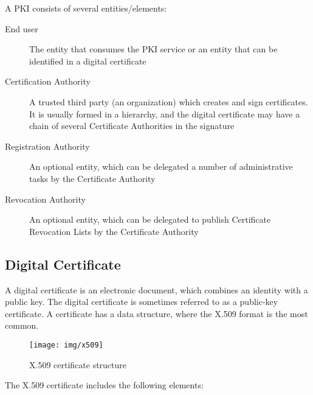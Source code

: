 \documentclass[12pt,a4paper,titlepage]{report}
\begin{document}
A PKI consists of several entities/elements:
\begin{description}
\item[End user] { The entity that consumes the PKI service or an entity that can be identified in a digital certificate }
\item[Certification Authority] { A trusted third party (an organization) which creates and sign certificates. It is usually formed in a hierarchy, and the digital certificate may have a chain of several Certificate Authorities in the signature }
\item[Registration Authority] { An optional entity, which can be delegated a number of administrative tasks by the Certificate Authority }
\item[Revocation Authority] { An optional entity, which can be delegated to publish Certificate Revocation Lists by the Certificate Authority }
\end{description}
% 


\subsection{Digital Certificate}
\label{sec:certificate}
A digital certificate is an electronic document, which combines an identity with a public key. The digital certificate is sometimes referred to as a public-key certificate. A certificate has a data structure, where the X.509 format is the most common. 

\begin{figure}[H]
\begin{center}
\texttt{[image: img/x509]}
\caption{X.509 certificate structure}
\end{center}
\end{figure}

The X.509 certificate includes the following elements:\cite{stallings, msx509, msdc}
\end{document}
